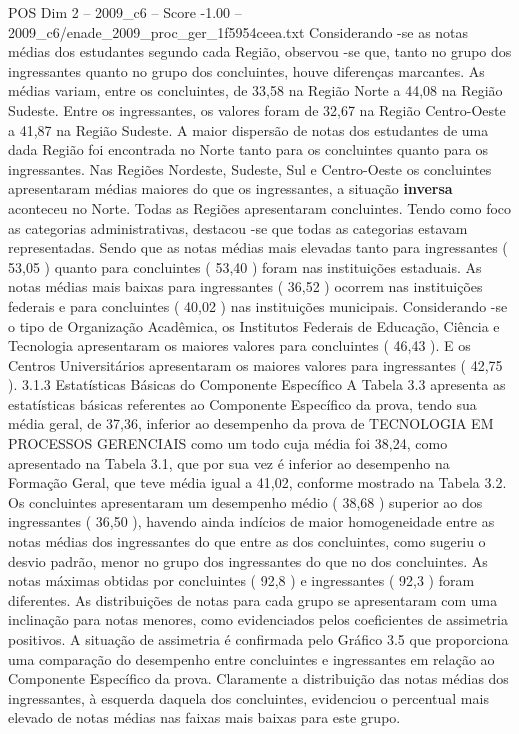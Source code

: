\begin{textsample}{POS Dim 2 – 2009\_c6 – Score -1.00 – 2009\_c6/enade\_2009\_proc\_ger\_1f5954ceea.txt}
Considerando -se as notas médias dos estudantes segundo cada Região, observou -se que, tanto no grupo dos ingressantes quanto no grupo dos concluintes, houve diferenças marcantes.
As médias variam, entre os concluintes, de 33,58 na Região Norte a 44,08 na Região Sudeste.
Entre os ingressantes, os valores foram de 32,67 na Região Centro-Oeste a 41,87 na Região Sudeste.
A maior dispersão de notas dos estudantes de uma dada Região foi encontrada no Norte tanto para os concluintes quanto para os ingressantes.
Nas Regiões Nordeste, Sudeste, Sul e Centro-Oeste os concluintes apresentaram médias maiores do que os ingressantes, a situação \textbf{inversa} aconteceu no Norte.
Todas as Regiões apresentaram concluintes.
Tendo como foco as categorias administrativas, destacou -se que todas as categorias estavam representadas.
Sendo que as notas médias mais elevadas tanto para ingressantes ( 53,05 ) quanto para concluintes ( 53,40 ) foram nas instituições estaduais.
As notas médias mais baixas para ingressantes ( 36,52 ) ocorrem nas instituições federais e para concluintes ( 40,02 ) nas instituições municipais.
Considerando -se o tipo de Organização Acadêmica, os Institutos Federais de Educação, Ciência e Tecnologia apresentaram os maiores valores para concluintes ( 46,43 ).
E os Centros Universitários apresentaram os maiores valores para ingressantes ( 42,75 ). 3.1.3 Estatísticas Básicas do Componente Específico A Tabela 3.3 apresenta as estatísticas básicas referentes ao Componente Específico da prova, tendo sua média geral, de 37,36, inferior ao desempenho da prova de TECNOLOGIA EM PROCESSOS GERENCIAIS como um todo cuja média foi 38,24, como apresentado na Tabela 3.1, que por sua vez é inferior ao desempenho na Formação Geral, que teve média igual a 41,02, conforme mostrado na Tabela 3.2.
Os concluintes apresentaram um desempenho médio ( 38,68 ) superior ao dos ingressantes ( 36,50 ), havendo ainda indícios de maior homogeneidade entre as notas médias dos ingressantes do que entre as dos concluintes, como sugeriu o desvio padrão, menor no grupo dos ingressantes do que no dos concluintes.
As notas máximas obtidas por concluintes ( 92,8 ) e ingressantes ( 92,3 ) foram diferentes.
As distribuições de notas para cada grupo se apresentaram com uma inclinação para notas menores, como evidenciados pelos coeficientes de assimetria positivos.
A situação de assimetria é confirmada pelo Gráfico 3.5 que proporciona uma comparação do desempenho entre concluintes e ingressantes em relação ao Componente Específico da prova.
Claramente a distribuição das notas médias dos ingressantes, à esquerda daquela dos concluintes, evidenciou o percentual mais elevado de notas médias nas faixas mais baixas para este grupo.

\end{textsample}
